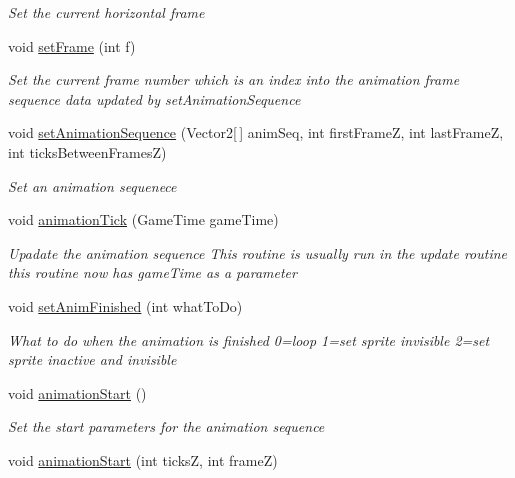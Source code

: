 \begin{DoxyCompactItemize}
\begin{DoxyCompactList}\small\item\em Set the current horizontal frame \end{DoxyCompactList}\item 
void \mbox{\hyperlink{class_r_c___framework_1_1_sprite3_a552be0daafb94d0cc7802a10539e5032}{set\+Frame}} (int f)
\begin{DoxyCompactList}\small\item\em Set the current frame number which is an index into the animation frame sequence data updated by set\+Animation\+Sequence \end{DoxyCompactList}\item 
void \mbox{\hyperlink{class_r_c___framework_1_1_sprite3_a2688823142342a7d1b2aaf91b8f5cc66}{set\+Animation\+Sequence}} (Vector2\mbox{[}$\,$\mbox{]} anim\+Seq, int first\+FrameZ, int last\+FrameZ, int ticks\+Between\+FramesZ)
\begin{DoxyCompactList}\small\item\em Set an animation sequenece \end{DoxyCompactList}\item 
void \mbox{\hyperlink{class_r_c___framework_1_1_sprite3_aaba067bf7bc24cd0acd437a057a69eec}{animation\+Tick}} (Game\+Time game\+Time)
\begin{DoxyCompactList}\small\item\em Upadate the animation sequence This routine is usually run in the update routine this routine now has game\+Time as a parameter \end{DoxyCompactList}\item 
void \mbox{\hyperlink{class_r_c___framework_1_1_sprite3_a280b1377c4b22b183c82956efa33c9e5}{set\+Anim\+Finished}} (int what\+To\+Do)
\begin{DoxyCompactList}\small\item\em What to do when the animation is finished 0=loop 1=set sprite invisible 2=set sprite inactive and invisible \end{DoxyCompactList}\item 
void \mbox{\hyperlink{class_r_c___framework_1_1_sprite3_ab181bdcfd7b9fcb12a931c13d2649d93}{animation\+Start}} ()
\begin{DoxyCompactList}\small\item\em Set the start parameters for the animation sequence \end{DoxyCompactList}\item 
void \mbox{\hyperlink{class_r_c___framework_1_1_sprite3_abaab134b0035e614af80fa1755118fd2}{animation\+Start}} (int ticksZ, int frameZ)

\end{DoxyCompactItemize}
